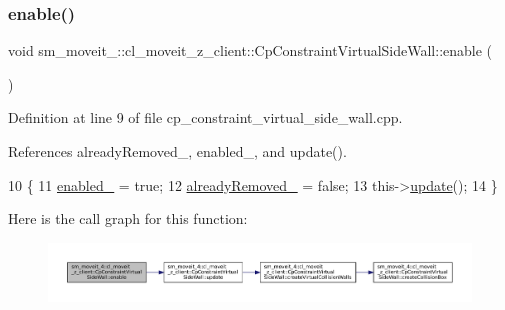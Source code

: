 \subsubsection{\texorpdfstring{enable()}{enable()}}
{\footnotesize\ttfamily void sm\+\_\+moveit\+\_\+::cl\+\_\+moveit\+\_\+z\+\_\+client\+::\+Cp\+Constraint\+Virtual\+Side\+Wall\+::enable (\begin{DoxyParamCaption}{ }\end{DoxyParamCaption})}



Definition at line 9 of file cp\+\_\+constraint\+\_\+virtual\+\_\+side\+\_\+wall.\+cpp.



References already\+Removed\+\_\+, enabled\+\_\+, and update().


\begin{DoxyCode}
10         \{
11             \hyperlink{classsm__moveit__4_1_1cl__moveit__z__client_1_1CpConstraintVirtualSideWall_a4456f8bf8328d103c2f9d3a04182babd}{enabled\_} = \textcolor{keyword}{true};
12             \hyperlink{classsm__moveit__4_1_1cl__moveit__z__client_1_1CpConstraintVirtualSideWall_a99dce43a47cbd8774e2f7deb1b3e1c47}{alreadyRemoved\_} = \textcolor{keyword}{false};
13             this->\hyperlink{classsm__moveit__4_1_1cl__moveit__z__client_1_1CpConstraintVirtualSideWall_af0a5fbcc097cdbda75888b2b2a2e1f9e}{update}();
14         \}
\end{DoxyCode}
Here is the call graph for this function\+:
\nopagebreak
\begin{figure}[H]
\begin{center}
\leavevmode
\includegraphics[width=350pt]{classsm__moveit__4_1_1cl__moveit__z__client_1_1CpConstraintVirtualSideWall_a0627edab82bc6c2831ebd781401c24db_cgraph}
\end{center}
\end{figure}
\mbox{\label{classsm__moveit__4_1_1cl__moveit__z__client_1_1CpConstraintVirtualSideWall_a790ff97860037f8587d1ef92752219b0}} 
